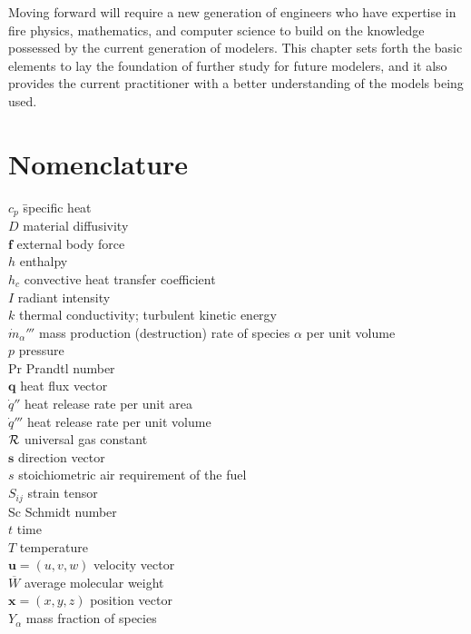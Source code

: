 \documentclass[graybox]{svmult}
\begin{document}
Moving forward will require a new generation of engineers who have expertise in fire physics, mathematics, and computer science to build on the knowledge possessed by the current generation of modelers. This chapter sets forth the basic elements to lay the foundation of further study for future modelers, and it also provides the current practitioner with a better understanding of the models being used.



\section{Nomenclature}

\begin{tabbing}
$c_p$ 	\hspace{1in}     \= specific heat \\
$D$	                     \> material diffusivity \\
$\mathbf{f}$	         \> external body force \\
$h$                      \>	enthalpy \\
$h_c$ 	                 \> convective heat transfer coefficient \\
$I$	                     \> radiant intensity \\
$k$	                     \> thermal	conductivity; turbulent	kinetic energy \\
$\dot{m}_\alpha'''$      \> mass production (destruction) rate of species $\alpha$ per unit volume \\
$p$	                     \> pressure \\
Pr	                     \> Prandtl number \\
$\mathbf{q}$	         \> heat flux vector \\
$\dot{q}''$              \> heat release rate per unit area \\
$\dot{q}'''$             \> heat release rate per unit volume \\
$\cal R$                 \> universal gas constant \\
$\mathbf{s}$	         \> direction vector \\
$s$	                     \> stoichiometric air requirement of the fuel \\
$S_{ij}$ 	             \> strain tensor \\
Sc	                     \> Schmidt number \\
$t$	                     \> time \\
$T$	                     \> temperature \\
$\mathbf{u}=(u,v,w)$     \> velocity vector \\
$\overline{W}$	         \> average molecular weight \\
$\mathbf{x}=(x,y,z)$	 \> position vector \\
$Y_\alpha$               \> mass fraction of species
\end{tabbing}
\end{document}
